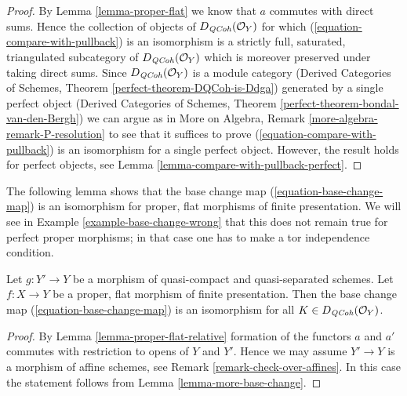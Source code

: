 \begin{proof}
By Lemma \ref{lemma-proper-flat} we know that $a$ commutes
with direct sums. Hence the collection of objects of
$D_{\mathit{QCoh}}(\mathcal{O}_Y)$ for which (\ref{equation-compare-with-pullback})
is an isomorphism is a strictly full, saturated, triangulated
subcategory of $D_{\mathit{QCoh}}(\mathcal{O}_Y)$ which is moreover
preserved under taking direct sums. Since $D_{\mathit{QCoh}}(\mathcal{O}_Y)$
is a module category (Derived Categories of Schemes, Theorem
\ref{perfect-theorem-DQCoh-is-Ddga}) generated by a single
perfect object (Derived Categories of Schemes, Theorem
\ref{perfect-theorem-bondal-van-den-Bergh})
we can argue as in
More on Algebra, Remark \ref{more-algebra-remark-P-resolution}
to see that it suffices to prove (\ref{equation-compare-with-pullback})
is an isomorphism for a single perfect object.
However, the result holds for perfect objects, see
Lemma \ref{lemma-compare-with-pullback-perfect}.
\end{proof}

\noindent
The following lemma shows that the base change map
(\ref{equation-base-change-map}) is an isomorphism
for proper, flat morphisms of finite presentation.
We will see in
Example \ref{example-base-change-wrong}
that this does not remain true for perfect proper morphisms;
in that case one has to make a tor independence condition.

\begin{lemma}
\label{lemma-proper-flat-base-change}
Let $g : Y' \to Y$ be a morphism of quasi-compact and quasi-separated schemes.
Let $f : X \to Y$ be a proper, flat morphism of finite presentation.
Then the base change map (\ref{equation-base-change-map}) is an isomorphism
for all $K \in D_{\mathit{QCoh}}(\mathcal{O}_Y)$.
\end{lemma}

\begin{proof}
By Lemma \ref{lemma-proper-flat-relative} formation of the
functors $a$ and $a'$ commutes with restriction to opens of $Y$ and $Y'$.
Hence we may assume $Y' \to Y$ is a morphism of affine schemes, see
Remark \ref{remark-check-over-affines}. In this
case the statement follows from Lemma \ref{lemma-more-base-change}.
\end{proof}

